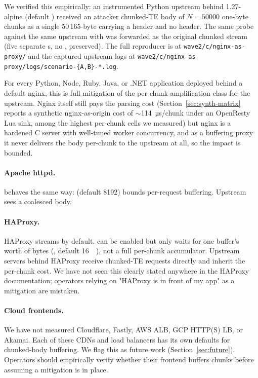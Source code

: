 We verified this empirically: an instrumented Python upstream
behind  1.27-alpine (default 
) received an attacker chunked-TE body of $N{=}\num{50000}$
one-byte chunks as a single 50\,165-byte  carrying a
 header and no
 header. The same probe against the same
upstream with  was forwarded
as the original chunked stream (five separate s, no
, 
preserved). The full reproducer is at
\texttt{wave2/c/nginx-as-proxy/} and the captured upstream logs
at \texttt{wave2/c/nginx-as-proxy/logs/scenario-\{A,B\}-*.log}.

For every Python, Node, Ruby, Java, or .NET application deployed
behind a default nginx, this is full mitigation of the per-chunk
amplification class for the upstream. Nginx itself still pays the
parsing cost (Section~\ref{sec:synth-matrix} reports a synthetic
nginx-as-origin cost of $\sim$\SI{114}{\micro\second}/chunk under
an OpenResty Lua sink, among the highest per-chunk cells we
measured) but nginx is a hardened C server with well-tuned
worker concurrency, and as a buffering proxy it never delivers the
body per-chunk to the upstream at all, so the impact is bounded.

\paragraph{Apache httpd.}
 behaves the same way:
 (default 8192) bounds per-request
buffering. Upstream sees a coalesced body.

\paragraph{HAProxy.}
HAProxy streams by default.  can be
enabled but only waits for one buffer's worth of bytes
(, default \SI{16}{\kibi\byte}), not a full
per-chunk accumulator. Upstream servers behind HAProxy receive
chunked-TE requests directly and inherit the per-chunk cost. We
have not seen this clearly stated anywhere in the HAProxy
documentation; operators relying on "HAProxy is in front of my
app" as a mitigation are mistaken.

\paragraph{Cloud frontends.}
We have not measured Cloudflare, Fastly, AWS ALB, GCP HTTP(S) LB,
or Akamai. Each of these CDNs and load balancers has its own
defaults for chunked-body buffering. We flag this as future work
(Section~\ref{sec:future}). Operators should empirically verify
whether their frontend buffers chunks before assuming a mitigation
is in place.

